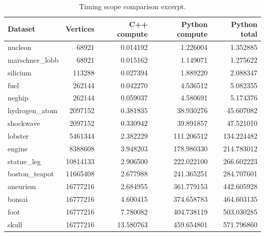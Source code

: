 \begin{table}[htbp]
\centering
\small
\caption{Timing scope comparison excerpt.}
\label{tab:timing-scope-excerpt}
\begin{tabular}{lrrrr}
\hline
Dataset & Vertices & C++ compute & Python compute & Python total \\
\hline
nucleon & 68921 & 0.014192 & 1.226004 & 1.352885 \\
marschner\_lobb & 68921 & 0.015162 & 1.149071 & 1.275622 \\
silicium & 113288 & 0.027394 & 1.889220 & 2.088347 \\
fuel & 262144 & 0.042270 & 4.536512 & 5.082355 \\
neghip & 262144 & 0.059037 & 4.580691 & 5.174376 \\
hydrogen\_atom & 2097152 & 0.381835 & 38.930276 & 45.607082 \\
shockwave & 2097152 & 0.330942 & 39.891857 & 47.521010 \\
lobster & 5461344 & 2.382229 & 111.206512 & 134.224482 \\
engine & 8388608 & 3.948203 & 178.980330 & 214.783012 \\
statue\_leg & 10814133 & 2.906500 & 222.022100 & 266.602223 \\
boston\_teapot & 11665408 & 2.677988 & 241.365251 & 284.707601 \\
aneurism & 16777216 & 2.684955 & 361.779153 & 442.605928 \\
bonsai & 16777216 & 4.600415 & 374.658783 & 464.603135 \\
foot & 16777216 & 7.780082 & 404.738119 & 503.030285 \\
skull & 16777216 & 13.580763 & 459.654801 & 571.796860 \\
\hline
\end{tabular}
\end{table}
